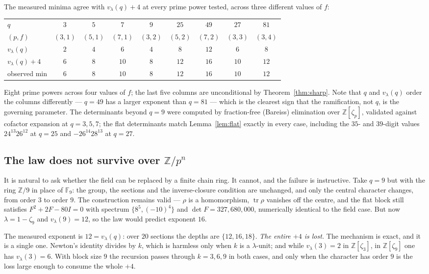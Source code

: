 \documentclass[11pt]{article}
\theoremstyle{plain}
\theoremstyle{definition}
\newcommand{\FF}{\mathbb F}
\newcommand{\ZZ}{\mathbb Z}
\newcommand{\tr}{\operatorname{tr}}
\newcommand{\vlam}{v_\lambda}
\begin{document}
The measured minima agree with $\vlam(q)+4$ at every prime power tested,
across three different values of $f$:
\begin{center}
\begin{tabular}{@{}lcccccccc@{}}
\toprule
$q$ & $3$ & $5$ & $7$ & $9$ & $25$ & $49$ & $27$ & $81$\\
$(p,f)$ & $(3,1)$ & $(5,1)$ & $(7,1)$ & $(3,2)$ & $(5,2)$ & $(7,2)$ & $(3,3)$ & $(3,4)$\\
\midrule
$\vlam(q)$ & $2$ & $4$ & $6$ & $4$ & $8$ & $12$ & $6$ & $8$\\
$\vlam(q)+4$ & $6$ & $8$ & $10$ & $8$ & $12$ & $16$ & $10$ & $12$\\
observed min & $6$ & $8$ & $10$ & $8$ & $12$ & $16$ & $10$ & $12$\\
\bottomrule
\end{tabular}
\end{center}
Eight prime powers across four values of $f$; the last five columns are
unconditional by Theorem~\ref{thm:sharp}. Note that $q$ and $\vlam(q)$ order
the columns differently --- $q=49$ has a larger exponent than $q=81$ --- which
is the clearest sign that the ramification, not $q$, is the governing
parameter. The determinants beyond $q=9$ were computed by fraction-free
(Bareiss) elimination over $\ZZ[\zeta_p]$, validated against cofactor
expansion at $q=3,5,7$; the flat determinants match Lemma~\ref{lem:flat}
exactly in every case, including the $35$- and $39$-digit values
$24^{13}26^{12}$ at $q=25$ and $-26^{14}28^{13}$ at $q=27$.

\subsection{The law does not survive over $\ZZ/p^{n}$}

It is natural to ask whether the field can be replaced by a finite chain ring.
It cannot, and the failure is instructive. Take $q=9$ but with the ring
$\ZZ/9$ in place of $\FF_9$: the group, the sections and the inverse-closure
condition are unchanged, and only the central character changes, from order
$3$ to order $9$. The construction remains valid --- $\rho$ is a homomorphism,
$\tr\rho$ vanishes off the centre, and the flat block still satisfies
$F^2+2F-80I=0$ with spectrum $\{8^5,(-10)^4\}$ and $\det F=327{,}680{,}000$,
numerically identical to the field case. But now $\lambda=1-\zeta_9$ and
$\vlam(9)=12$, so the law would predict exponent $16$.

The measured exponent is $12=\vlam(q)$: over $20$ sections the depths are
$\{12,16,18\}$. \emph{The entire $+4$ is lost.} The mechanism is exact, and it
is a single one. Newton's identity divides by $k$, which is harmless only when
$k$ is a $\lambda$-unit; and while $\vlam(3)=2$ in $\ZZ[\zeta_3]$, in
$\ZZ[\zeta_9]$ one has $\vlam(3)=6$. With block size $9$ the recursion passes
through $k=3,6,9$ in both cases, and only when the character has order $9$ is
the loss large enough to consume the whole $+4$.
\end{document}
